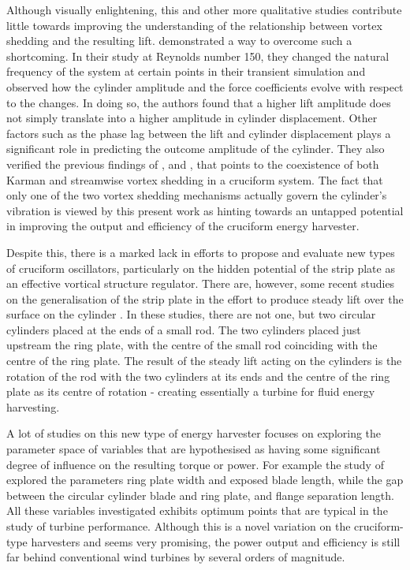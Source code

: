 \documentclass[oneside]{utmthesis}
\begin{document}
Although visually enlightening, this and other more qualitative studies contribute little towards improving the understanding of the relationship between vortex shedding and the resulting lift. \citet{Deng2007} demonstrated a way to overcome such a shortcoming. In their study at Reynolds number 150, they changed the natural frequency of the system at certain points in their transient simulation and observed how the cylinder amplitude and the force coefficients evolve with respect to the changes. In doing so, the authors found that a higher lift amplitude does not simply translate into a higher amplitude in cylinder displacement. Other factors such as the phase lag between the lift and cylinder displacement plays a significant role in predicting the outcome amplitude of the cylinder. They also verified the previous findings of \citet{Shirakashi1989}, \citet{Koide2009} and \citet{Koide2017}, that points to the coexistence of both Karman and streamwise vortex shedding in a cruciform system. The fact that only one of the two vortex shedding mechanisms actually govern the cylinder's vibration is viewed by this present work as hinting towards an untapped potential in improving the output and efficiency of the cruciform energy harvester.

Despite this, there is a marked lack in efforts to propose and evaluate new types of cruciform oscillators, particularly on the hidden potential of the strip plate as an effective vortical structure regulator. There are, however, some recent studies on the generalisation of the strip plate in the effort to produce steady lift over the surface on the cylinder \citep{Hemsuwan2018a,Hemsuwan2018b,Hemsuwan2018c,Hemsuwan2018d}. In these studies, there are not one, but two circular cylinders placed at the ends of a small rod. The two cylinders placed just upstream the ring plate, with the centre of the small rod coinciding with the centre of the ring plate. The result of the steady lift acting on the cylinders is the rotation of the rod with the two cylinders at its ends and the centre of the ring plate as its centre of rotation - creating essentially a turbine for fluid energy harvesting.

A lot of studies on this new type of energy harvester focuses on exploring the parameter space of variables that are hypothesised as having some significant degree of influence on the resulting torque or power. For example the study of \citet{Hemsuwan2021} explored the parameters ring plate width and exposed blade length, while \citet{Sakamoto2021} the gap between the circular cylinder blade and ring plate, and flange separation length. All these variables investigated exhibits optimum points that are typical in the study of turbine performance. Although this is a novel variation on the cruciform-type harvesters and seems very promising, the power output and efficiency is still far behind conventional wind turbines by several orders of magnitude.
\end{document}
